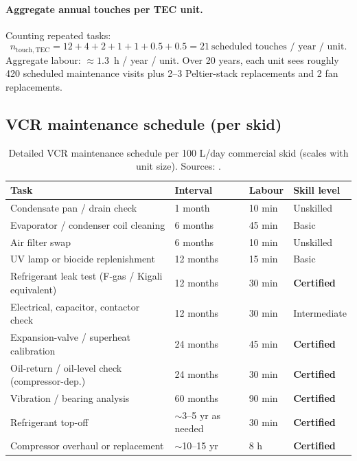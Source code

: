 \documentclass[11pt,a4paper]{article}
\begin{document}
\paragraph{Aggregate annual touches per TEC unit.} Counting repeated tasks:
\begin{equation}
n_{\mathrm{touch,TEC}} = 12 + 4 + 2 + 1 + 1 + 0.5 + 0.5 = 21\ \text{scheduled touches / year / unit.}
\end{equation}
Aggregate labour: $\approx 1.3$~h / year / unit. Over 20 years, each unit sees roughly 420 scheduled maintenance visits plus 2--3 Peltier-stack replacements and 2 fan replacements.

\subsection{VCR maintenance schedule (per skid)}
\begin{table}[h]
\centering\small
\caption{Detailed VCR maintenance schedule per 100 L/day commercial skid (scales with unit size). Sources: \citep{ashrae_hvac_maintenance_2021,lowes_vcr_2023,fgas_eu_2024}.}
\label{tab:vcr_maint}
\begin{tabular}{@{}llll@{}}
\toprule
\textbf{Task} & \textbf{Interval} & \textbf{Labour} & \textbf{Skill level}\\
\midrule
Condensate pan / drain check                     & 1 month & 10 min & Unskilled \\
Evaporator / condenser coil cleaning             & 6 months & 45 min & Basic \\
Air filter swap                                   & 6 months & 10 min & Unskilled \\
UV lamp or biocide replenishment                 & 12 months & 15 min & Basic \\
Refrigerant leak test (F-gas / Kigali equivalent)& 12 months & 30 min & \textbf{Certified} \\
Electrical, capacitor, contactor check           & 12 months & 30 min & Intermediate \\
Expansion-valve / superheat calibration          & 24 months & 45 min & \textbf{Certified} \\
Oil-return / oil-level check (compressor-dep.)   & 24 months & 30 min & \textbf{Certified} \\
Vibration / bearing analysis                     & 60 months & 90 min & \textbf{Certified} \\
Refrigerant top-off                               & $\sim$3--5 yr as needed & 30 min & \textbf{Certified} \\
Compressor overhaul or replacement                & $\sim$10--15 yr & 8 h   & \textbf{Certified} \\
\bottomrule
\end{tabular}
\end{table}
\end{document}
